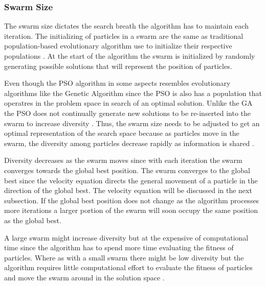 \subsubsection{Swarm Size}
The swarm size dictates the search breath the algorithm has to maintain each iteration\cite{FixedFAPPSO,CompuIntelligenceIntro}. The initializing of particles in a swarm are the same as traditional population-based evolutionary algorithm use to initialize their respective populations \cite{FixedFAPPSO}.  At the start of the algorithm the swarm is initialized by randomly generating possible solutions that will represent the position of particles\cite{CompuIntelligenceIntro}. 

Even though the PSO algorithm in some aspects resembles evolutionary algorithms like the Genetic Algorithm since the PSO is also has a population that operatres in the problem space in search of an optimal solution. Unlike the GA the PSO does not continually generate new solutions to be re-inserted into the swarm to increase diversity \cite{PSOHybridUnitCommit}. Thus, the swarm size needs to be adjusted to get an optimal representation of the search space because as particles move in the swarm, the diversity among particles decrease rapidly as information is shared \cite{FundamentalSwarm,CompuIntelligenceIntro}. 

Diversity decreases as the swarm moves since with each iteration the swarm converges towards the global best position\cite{PSOHybridJobShop,CompuIntelligenceIntro,FundamentalSwarm}. The swarm converges to the global best since the velocity equation directs the general movement of a particle in the direction of the global bes\cite{PSOHybridJobShop,CompuIntelligenceIntro,FundamentalSwarm}t. The velocity equation will be discussed in the next subsectio\cite{PSOHybridJobShop,CompuIntelligenceIntro,FundamentalSwarm}n. If the global best position does not change as the algorithm processes more iterations a larger portion of the swarm will soon occupy the same position as the global bes\cite{PSOHybridJobShop,CompuIntelligenceIntro,FundamentalSwarm}t.

A large swarm might increase diversity but at the expensive of computational time since the algorithm has to spend more time evaluating the fitness of particles\cite{FundamentalSwarm,CompuIntelligenceIntro}. Where as with a small swarm there might be low diversity but the algorithm requires little computational effort to evaluate the fitness of particles and move the swarm around in the solution space \cite{FundamentalSwarm,CompuIntelligenceIntro}.

